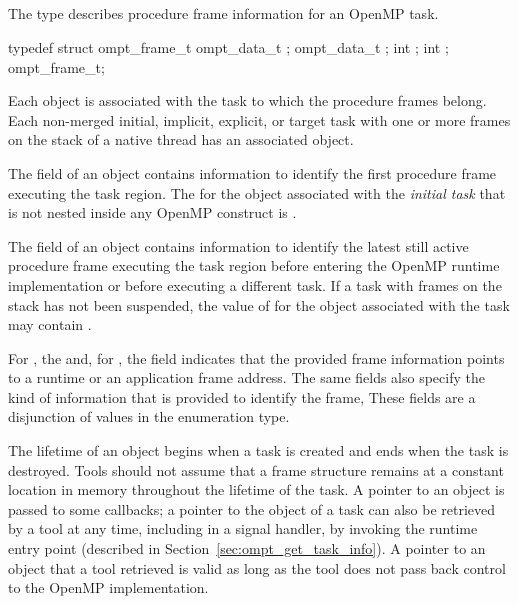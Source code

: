\subsection{}
\label{sec:ompt_frame_t}
\label{subsubsubsec:ompt_frame_t}

\summary
The  type describes procedure frame information 
for an OpenMP task.

\syntax
\begin{ccppspecific}
\begin{ompSyntax}
typedef struct ompt_frame_t {
  ompt_data_t ;
  ompt_data_t ;
  int ;
  int ;
} ompt_frame_t;
\end{ompSyntax}
\end{ccppspecific}

\descr
Each  object is associated with the task to which 
the procedure frames belong. Each non-merged initial, implicit, explicit, 
or target task with one or more frames on the stack of a native thread 
has an associated  object.

The  field of an  object contains
information to identify the first procedure frame executing the task region.
The  for the  object associated with 
the \emph{initial task} that is not nested inside any OpenMP construct 
is .

The  field of an  object contains
information to identify the latest still active procedure frame 
executing the task region before entering the OpenMP runtime 
implementation or before executing a different task. If a task with 
frames on the stack has not been suspended, the value of  
for the  object associated with the task may 
contain .

For , the  and, for ,
the  field indicates that the provided frame information 
points to a runtime or an application frame address. The same fields also 
specify the kind of information that is provided to identify the frame, These 
fields are a disjunction of values in the  enumeration type.

The lifetime of an  object begins when a task is created
and ends when the task is destroyed. Tools should not assume that
a frame structure remains at a constant location in memory throughout the
lifetime of the task. A pointer to an  object is passed 
to some callbacks; a pointer to the  object of a task
can also be retrieved by a tool at any time, including in a signal
handler, by invoking the  runtime entry point 
(described in Section~\ref{sec:ompt_get_task_info}). A pointer to an 
 object that a tool retrieved is valid as long as 
the tool does not pass back control to the OpenMP implementation.

